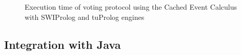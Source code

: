 \begin{figure}
\centering
{}
\caption{Execution time of voting protocol using the Cached Event Calculus with SWIProlog and
tuProlog engines}\label{fig:cec}
\end{figure}

\subsection{Integration with Java}

